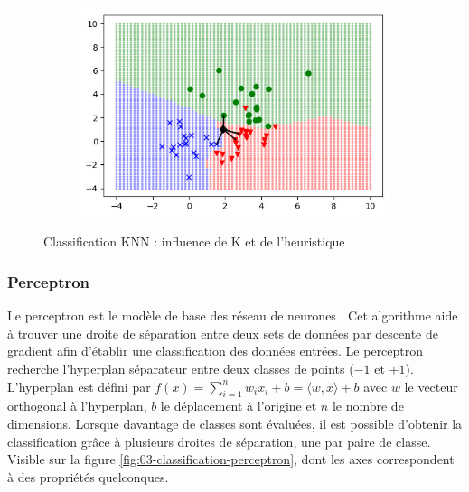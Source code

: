 \documentclass[../thesis.tex]{subfiles}
\begin{document}
\begin{figure}[H]
\begin{subfigure}[b]{0.3\textwidth}
            \includegraphics[width=\linewidth]{img/biblio/classification-knn-4-decrement}
        \end{subfigure}
        \caption{Classification KNN : influence de K et de l'heuristique}
        \label{fig:03-classification-knn}
    \end{figure}
    
    \newpage
    \subsubsection{Perceptron} Le perceptron est le modèle de base des réseau de neurones \cite{rosenblatt1958perceptron}. Cet algorithme aide à trouver une droite de séparation entre deux sets de données par descente de gradient afin d'établir une classification des données entrées. Le perceptron recherche l'hyperplan séparateur entre deux classes de points ($-1$ et $+1$). L'hyperplan est défini par $f(x) = \sum_{i=1}^n w_i x_i + b = \langle w, x \rangle + b$ avec $w$ le vecteur orthogonal à l'hyperplan, $b$ le déplacement à l'origine et $n$ le nombre de dimensions. Lorsque davantage de classes sont évaluées, il est possible d'obtenir la classification grâce à plusieurs droites de séparation, une par paire de classe. Visible sur la figure \ref{fig:03-classification-perceptron}, dont les axes correspondent à des propriétés quelconques.
    
\end{document}
